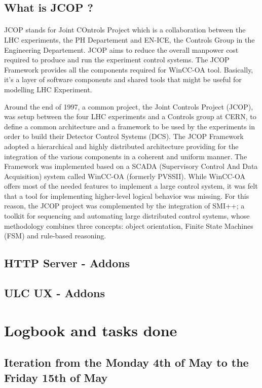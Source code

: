 \documentclass[a4paper, 12pt]{article}
\begin{document}
\subsection{What is JCOP ?}
\paragraph{}
JCOP stands for Joint COntrols Project which is a collaboration between the LHC experiments, the PH Departement and EN-ICE, the Controls Group in the Engineering Departement. 
JCOP aims to reduce the overall manpower cost required to produce and run the experiment control systems.
The JCOP Framework provides all the components required for WinCC-OA tool. 
Basically, it's a layer of software components and shared tools that might be useful for modelling LHC Experiment.

Around the end of 1997, a common project, the Joint Controls Project (JCOP), was setup between the four LHC experiments and a Controls group at CERN, to define a common architecture and a framework to be used by the experiments in order to build their Detector Control Systems (DCS).
The JCOP Framework adopted a hierarchical and highly distributed architecture providing for the integration of the various components in a coherent and uniform manner. 
The Framework was implemented based on a SCADA (Supervisory Control And Data Acquisition) system called WinCC-OA (formerly PVSSII). 
While WinCC-OA offers most of the needed features to implement a large control system, it was felt that a tool for implementing higher-level logical behavior was missing.
For this reason, the JCOP project was complemented by the integration of SMI++; a toolkit for sequencing and automating large distributed control systems, whose methodology combines three concepts: object orientation, Finite State Machines (FSM) and rule-based reasoning.

\subsection{HTTP Server - Addons}
\subsection{ULC UX - Addons}

\section{Logbook and tasks done}
\subsection{Iteration from the Monday 4th of May to the Friday 15th of May}
\end{document}
